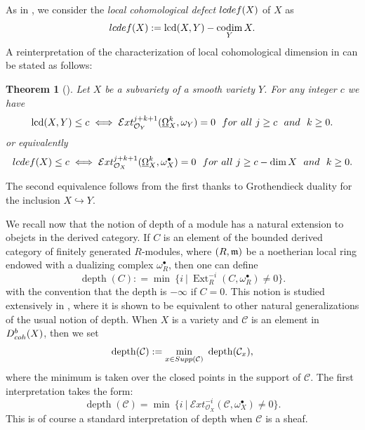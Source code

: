 \documentclass[11pt]{amsart}
\newtheorem{theorem}[equation]{Theorem}
\theoremstyle{definition}
\theoremstyle{plain}
\newcommand{\m}{\mathfrak m}
\newcommand{\C}{\mathcal C}
\newcommand{\E}{\mathcal E}
\renewcommand{\O}{\mathcal O}
\DeclareMathOperator{\Ext}{Ext}
\newcommand{\sExt}{\E xt} %
\newcommand{\DB}{\underline{\Omega}} %
\DeclareMathOperator{\lcd}{lcd}
\DeclareMathOperator{\codim}{codim}
\DeclareMathOperator{\depth}{depth}
\begin{document}
As in \cite{PSh}, we consider the \emph{local cohomological defect} ${\rm lcdef} (X)$ of $X$ as
$${\rm lcdef} (X) : = \lcd (X, Y) - \codim_Y X.$$
A reinterpretation of the characterization of local cohomological dimension in \cite[Theorem E]{MP-LC} can be stated as follows:


\begin{theorem}[{\cite[Corollary 12.6]{MP-LC}}]\label{thm:LCD}
Let $X$ be a subvariety of a smooth variety $Y$. For any integer $c$ we have 
$$\lcd(X, Y) \le c  \iff \sExt^{j + k + 1}_{\O_Y}(\DB_X^k,\omega_Y) = 0 \,\,\,\,{\rm for ~all~}j \ge c \,\,\,\,{\rm and}\,\,\,\, k \ge 0.$$
or equivalently 
$${\rm lcdef} (X) \le c  \iff  \sExt^{j + k + 1}_{\O_X}(\DB_X^k,\omega_X^{\bullet}) = 0 \,\,\,\,{\rm for ~all~}j \ge c - \dim X \,\,\,\,{\rm and}\,\,\,\, k \ge 0.$$
\end{theorem}

The second equivalence follows from the first thanks to Grothendieck duality for the inclusion $X \hookrightarrow Y$.  

We recall now that the notion of depth of a module has a natural extension to obejcts in the derived category. If $C$ is an element of the bounded derived category of finitely generated $R$-modules, where $(R, \frak{m})$ be a noetherian local ring endowed with a dualizing complex 
$\omega_R^\bullet$, then one can define
$$\depth(C) : = \min~  \{i ~|~\Ext^{-i}_R (C,\omega_R^{\bullet})\neq 0\}.$$
with the convention that the depth is $-\infty$ if $C = 0$. This notion is studied extensively in \cite{FY}, where it is shown to be equivalent
to other natural generalizations of the usual notion of depth. 
When $X$ is a variety and $\C$ is an element in $D^b_{\rm coh} (X)$, then we set 
$$\depth(\C) : = \min_{x \in {\rm Supp} (\C)}~ \depth(\C_x),$$
where the minimum is taken over the closed points in the support of $\C$. The first interpretation takes the form: 
\begin{equation}\label{eqn:depth}
\depth(\C) = \min~  \{i ~|~\sExt^{-i}_{\O_X} (\C,\omega_X^{\bullet})\neq 0\}.
\end{equation}
This is of course a standard interpretation of depth when $\C$ is a sheaf.
\end{document}
